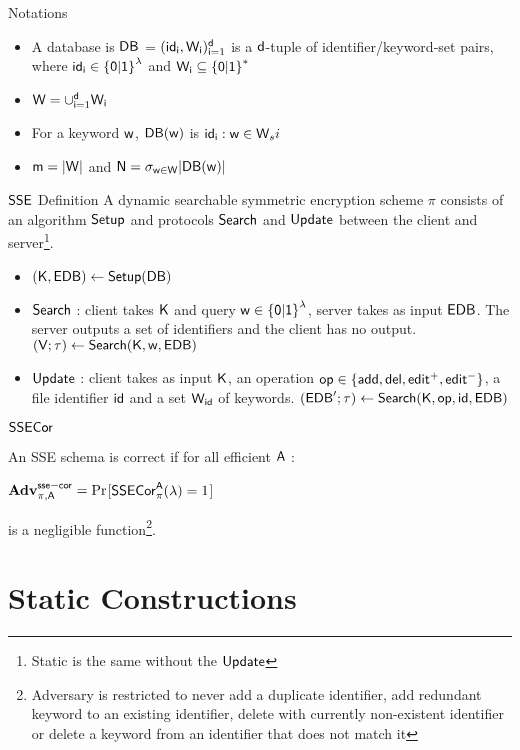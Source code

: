 \documentclass{beamer}
\begin{document}
\begin{frame}{Notations}
\begin{itemize}
\item A database is $\mathsf{DB}$ = $(\mathsf{id}_{\mathsf{i}},\mathsf{W}_{\mathsf{i}})^{\mathsf{d}}_{\mathsf{i}=1}$ 
is a $\mathsf{d}$-tuple of identifier/keyword-set pairs, where $\mathsf{id}_{\mathsf{i}} \in \mathsf{\{0|1\}}^\lambda$ and $\mathsf{W}_{\mathsf{i}} \subseteq \mathsf{\{0|1\}}^*$
\item $\mathsf{W} = \cup^{\mathsf{d}}_{\mathsf{i}=1} \mathsf{W}_{\mathsf{i}}$
\item For a keyword $\mathsf{w}$, $\mathsf{DB}(\mathsf{w})$ is {$\mathsf{id}_{\mathsf{i}}: \mathsf{w} \in \mathsf{W}_si$}
\item $\mathsf{m} = |\mathsf{W}|$ and $\mathsf{N} = \sigma_{\mathsf{w} \in \mathsf{W}}|\mathsf{DB}(\mathsf{w})|$
\end{itemize}
\end{frame}

\begin{frame}{$\mathsf{SSE}$ Definition}
A dynamic searchable symmetric encryption scheme $\pi$ consists of an algorithm $\mathsf{Setup}$ and protocols $\mathsf{Search}$ and $\mathsf{Update}$ between the client and server\footnote{Static is the same without the $\mathsf{Update}$}.
\begin{itemize}
\item $(\mathsf{K},\mathsf{EDB}) \leftarrow \mathsf{Setup}(\mathsf{DB})$
\item $\mathsf{Search}$ : client takes $\mathsf{K}$ and query $\mathsf{w} \in \mathsf{\{0|1\}}^{\lambda}$, server takes  as input $\mathsf{EDB}$. The server outputs a set of identifiers and the client has no output.
$(\mathsf{V};\tau) \leftarrow \mathsf{Search}(\mathsf{K},\mathsf{w},\mathsf{EDB})$
\item $\mathsf{Update}$ : client takes as input $\mathsf{K}$, an operation $\mathsf{op} \in \{\mathsf{add},\mathsf{del},\mathsf{edit^+},\mathsf{edit^-}\}$, a file identifier $\mathsf{id}$ and a set $\mathsf{W}_{\mathsf{id}}$ of keywords.
$(\mathsf{EDB}';\tau) \leftarrow \mathsf{Search}(\mathsf{K},\mathsf{op},\mathsf{id},\mathsf{EDB})$
\end{itemize}
\end{frame}

\begin{frame}{$\mathsf{SSECor}$}
\begin{definition}[3] An SSE schema is correct if for all efficient $\mathsf{A}$ : 
\begin{center}
$\textbf{Adv}^{\mathsf{sse-cor}}_{\pi,\mathsf{A}} = \Pr$[$\mathsf{SSECor}^{\mathsf{A}}_\pi(\lambda)=1$]
\end{center}
is a negligible function\footnote{Adversary is restricted to never add a duplicate identifier, add redundant keyword to an existing identifier, delete with currently non-existent identifier or delete a keyword from an identifier that does not match it}.
\end{definition}
\vfill
\end{frame}

\begin{frame}{}

\end{frame}

\section{Static Constructions}

\begin{frame}{}
\end{frame}
\end{document}
